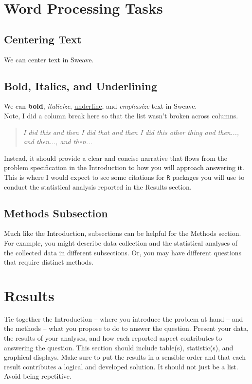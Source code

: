 \documentclass{article}\usepackage[]{graphicx}\usepackage[]{xcolor}
\begin{document}
\begin{multicols}{2}
\section{Word Processing Tasks}
\subsection{Centering Text}
\begin{center}
We can center text in Sweave.
\end{center}
\subsection{Bold, Italics, and Underlining}
\noindent We can \textbf{bold}, \textit{italicize}, \underline{underline}, and \emph{emphasize} text in Sweave. \\Note, I did a column break here so that the list wasn't broken across columns. 
\columnbreak

\begin{quote}
\textit{I did this and then I did that and then I did this other thing and then..., and then..., and then...}
\end{quote}
Instead, it should provide a clear and concise narrative that flows from the problem specification in the Introduction to how you will approach answering it. This is where I would expect to see some citations for \texttt{R} packages you will use to conduct the statistical analysis reported in the Results section.


\subsection{Methods Subsection}
Much like the Introduction, subsections can be helpful for the Methods section. For example, you might describe data collection and the statistical analyses of the collected data in different subsections. Or, you may have different questions that require distinct methods. 

\section{Results}
Tie together the Introduction -- where you introduce the problem at hand -- and the methods --  what you propose to do to answer the question. Present your data, the results of your analyses, and how each reported aspect contributes to answering the question. This section should include table(s), statistic(s), and graphical displays. Make sure to put the results in a sensible order and that each result contributes a logical and developed solution. It should not just be a list. Avoid being repetitive. 


\end{multicols}
\end{document}

